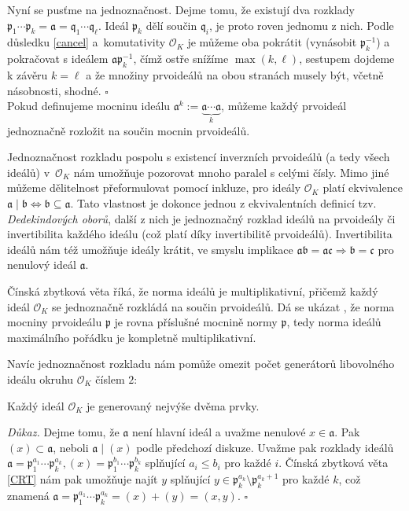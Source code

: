 \documentclass[12pt]{report}
\begin{document}
Nyní se pusťme na jednoznačnost. Dejme tomu, že existují dva rozklady $\mathfrak{p}_1 \cdots \mathfrak{p}_k = \mathfrak{a} = \mathfrak{q}_1 \cdots \mathfrak{q}_{\ell}$. Ideál $\mathfrak{p}_k$ dělí součin $\mathfrak{q}_i$, je proto roven jednomu z nich. Podle důsledku \ref{cancel} a~komutativity $\mathcal{O}_K$ je můžeme oba pokrátit (vynásobit $\mathfrak{p}_k^{-1}$) a pokračovat s ideálem $\mathfrak{a} \mathfrak{p}_k^{-1}$, čímž ostře snížíme $\max (k,\ell)$, sestupem dojdeme k závěru $k = \ell$ a že množiny prvoideálů na obou stranách musely být, včetně násobnosti, shodné. \hfill $\square$\\

Pokud definujeme mocninu ideálu $\mathfrak{a}^k := \underbrace{\mathfrak{a} \cdots \mathfrak{a}}_{k}$, můžeme každý prvoideál jednoznačně rozložit na součin mocnin prvoideálů.

Jednoznačnost rozkladu pospolu s existencí inverzních prvoideálů (a tedy všech ideálů) v~$\mathcal{O}_K$ nám umožňuje pozorovat mnoho paralel s celými čísly. Mimo jiné můžeme dělitelnost přeformulovat pomocí inkluze, pro ideály $\mathcal{O}_K$ platí ekvivalence $\mathfrak{a} \mid \mathfrak{b} \Leftrightarrow \mathfrak{b} \subseteq \mathfrak{a}$. Tato vlastnost je dokonce jednou z ekvivalentních definicí tzv. \textit{Dedekindových oborů}, další z nich je jednoznačný rozklad ideálů na prvoideály či invertibilita každého ideálu (což platí díky invertibilitě prvoideálů). Invertibilita ideálů nám též umožňuje ideály krátit, ve smyslu implikace $\mathfrak{a b} =\mathfrak{ac} \Rightarrow \mathfrak{b} = \mathfrak{c}$ pro nenulový ideál $\mathfrak{a}$.

Čínská zbytková věta říká, že norma ideálů je multiplikativní, přičemž každý ideál $\mathcal{O}_K$ se jednoznačně rozkládá na součin prvoideálů. Dá se ukázat \cite[Věta 4.3.18.]{Pupik}, že norma mocniny prvoideálu $\mathfrak{p}$ je rovna příslušné mocnině normy $\mathfrak{p}$, tedy norma ideálů maximálního pořádku je kompletně multiplikativní.

Navíc jednoznačnost rozkladu nám pomůže omezit počet generátorů libovolného ideálu okruhu $\mathcal{O}_K$ číslem $2$:
\begin{veta}
Každý ideál $\mathcal{O}_K$ je generovaný nejvýše dvěma prvky.
\end{veta}
\noindent \textit{Důkaz.} Dejme tomu, že $\mathfrak{a}$ není hlavní ideál a uvažme nenulové $x \in \mathfrak{a}$. Pak $(x) \subset \mathfrak{a}$, neboli $\mathfrak{a} \mid (x)$ podle předchozí diskuze. Uvažme pak rozklady ideálů $\mathfrak{a} = \mathfrak{p}_1 ^{a_1} \cdots \mathfrak{p}_k ^ {a_k},(x) = \mathfrak{p}_1 ^{b_1} \cdots \mathfrak{p}_k ^{b_k}$ splňující $a_i \leqslant b_i$ pro každé $i$. Čínská zbytková věta \ref{CRT} nám pak umožňuje najít $y$ splňující $y \in \mathfrak{p}_k^{a_k} \setminus \mathfrak{p}_k^{a_k+1}$ pro každé $k$, což znamená $\mathfrak{a} = \mathfrak{p}_1 ^{a_1} \cdots \mathfrak{p}_k ^ {a_k} = (x)+(y) = (x,y)$. \hfill $\square$\\ 
\end{document}
